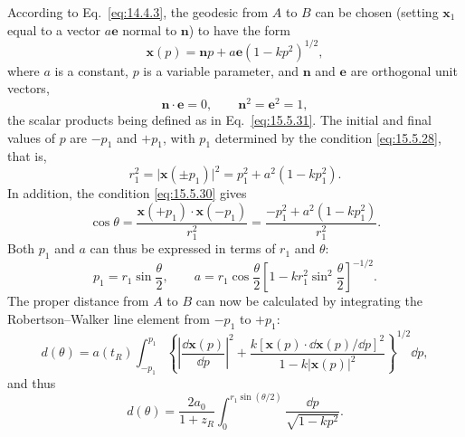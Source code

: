 According to Eq.~\eqref{eq:14.4.3}, the geodesic from \(A\) to \(B\) can be
chosen (setting \(\mathbf x_1\) equal to a vector \(a\mathbf e\) normal to
\(\mathbf n\)) to have the form
\begin{equation}
  \mathbf x(p)
  =
  \mathbf n p+a\mathbf e(1-kp^2)^{1/2},
  \tag{15.5.32}\label{eq:15.5.32}
\end{equation}
where \(a\) is a constant, \(p\) is a variable parameter, and \(\mathbf n\)
and \(\mathbf e\) are orthogonal unit vectors,
\begin{equation}
  \mathbf n\cdot\mathbf e=0,
  \qquad
  \mathbf n^2=\mathbf e^2=1,
  \tag{15.5.33}\label{eq:15.5.33}
\end{equation}
the scalar products being defined as in Eq.~\eqref{eq:15.5.31}. The initial
and final values of \(p\) are \(-p_1\) and \(+p_1\), with \(p_1\) determined
by the condition \eqref{eq:15.5.28}, that is,
\[
  r_1^2
  =
  \lvert\mathbf x(\pm p_1)\rvert^2
  =
  p_1^2+a^2(1-kp_1^2).
\]
In addition, the condition \eqref{eq:15.5.30} gives
\[
  \cos\theta
  =
  \frac{\mathbf x(+p_1)\cdot\mathbf x(-p_1)}{r_1^2}
  =
  \frac{-p_1^2+a^2(1-kp_1^2)}{r_1^2}.
\]
Both \(p_1\) and \(a\) can thus be expressed in terms of \(r_1\) and
\(\theta\):
\[
  p_1=r_1\sin\frac{\theta}{2},
  \qquad
  a=r_1\cos\frac{\theta}{2}
  \left[
    1-kr_1^2\sin^2\frac{\theta}{2}
  \right]^{-1/2}.
\]
The proper distance from \(A\) to \(B\) can now be calculated by integrating
the Robertson--Walker line element from \(-p_1\) to \(+p_1\):
\[
  d(\theta)
  =
  a(t_R)
  \int_{-p_1}^{p_1}
  \left\{
    \left\lvert\frac{\dd\mathbf x(p)}{\dd p}\right\rvert^2
    +
    \frac{k[\mathbf x(p)\cdot\dd\mathbf x(p)/\dd p]^2}
    {1-k\lvert\mathbf x(p)\rvert^2}
  \right\}^{1/2}\dd p,
\]
and thus
\begin{equation}
  d(\theta)
  =
  \frac{2a_0}{1+z_R}
  \int_0^{r_1\sin(\theta/2)}
  \frac{\dd p}{\sqrt{1-kp^2}}.
  \tag{15.5.34}\label{eq:15.5.34}
\end{equation}

